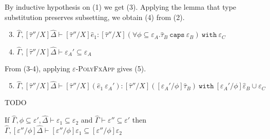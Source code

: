 \documentclass{llncs}
\newcommand{\keywadj}[1]{\mathtt{#1}}
\newcommand{\keyw}[1]{\keywadj{#1}~}
\newcommand{\kw}[1]{\keyw{ #1 }}
\begin{document}
By inductive hypothesis on (1) we get (3). Applying the lemma that type substitution preserves subsetting, we obtain (4) from (2).

\begin{enumerate}
	\setcounter{enumi}{2}
	\item $\hat \Gamma, [\hat \tau''/X]\hat \Delta \vdash [\hat \tau''/X]\hat e_1: [\hat \tau''/X](\forall \phi \subseteq \varepsilon_A. \hat \tau_B~\kw{caps} \varepsilon_B)~\kw{with} \varepsilon_C$
	\item $\hat \Gamma, [\hat \tau''/X]\hat \Delta \vdash\varepsilon_A' \subseteq \varepsilon_A$
\end{enumerate}

From (3-4), applying \textsc{$\varepsilon$-PolyFxApp} gives (5).

\begin{enumerate}
	\setcounter{enumi}{4}
	\item $\hat \Gamma, [\hat \tau''/X]\hat \Delta \vdash [\hat \tau''/X](\hat e_1~\varepsilon_A'): [\hat \tau''/X]( [\varepsilon_A'/\phi]\hat \tau_B)~\kw{with} [\varepsilon_A'/\phi]\hat \varepsilon_B \cup \varepsilon_C$
\end{enumerate}

 TODO

\hrulefill

\begin{lemma}
If $\hat \Gamma, \phi \subseteq \varepsilon', \hat \Delta \vdash \varepsilon_1 \subseteq \varepsilon_2$ and $\hat \Gamma \vdash \varepsilon'' \subseteq \varepsilon'$ then $\hat \Gamma, [\varepsilon''/\phi]\hat \Delta \vdash [\varepsilon''/\phi]\varepsilon_1 \subseteq [\varepsilon''/\phi]\varepsilon_2$
\end{lemma}
\end{document}
